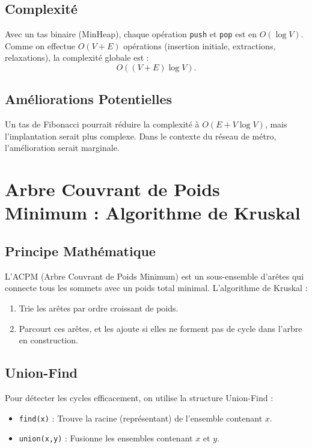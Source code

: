 \documentclass[a4paper,12pt]{article}
\begin{document}
\subsection{Complexité}

Avec un tas binaire (MinHeap), chaque opération \texttt{push} et \texttt{pop} est en $O(\log V)$. Comme on effectue $O(V+E)$ opérations (insertion initiale, extractions, relaxations), la complexité globale est :
\[
O((V+E)\log V).
\]

\subsection{Améliorations Potentielles}

Un tas de Fibonacci pourrait réduire la complexité à $O(E + V\log V)$, mais l'implantation serait plus complexe. Dans le contexte du réseau de métro, l’amélioration serait marginale.

\section{Arbre Couvrant de Poids Minimum : Algorithme de Kruskal}

\subsection{Principe Mathématique}

L’ACPM (Arbre Couvrant de Poids Minimum) est un sous-ensemble d’arêtes qui connecte tous les sommets avec un poids total minimal. L’algorithme de Kruskal :
\begin{enumerate}
    \item Trie les arêtes par ordre croissant de poids.
    \item Parcourt ces arêtes, et les ajoute si elles ne forment pas de cycle dans l’arbre en construction.
\end{enumerate}


\subsection{Union-Find}

Pour détecter les cycles efficacement, on utilise la structure Union-Find :
\begin{itemize}
    \item \texttt{find(x)} : Trouve la racine (représentant) de l’ensemble contenant $x$.
    \item \texttt{union(x,y)} : Fusionne les ensembles contenant $x$ et $y$.
\end{itemize}
\end{document}
